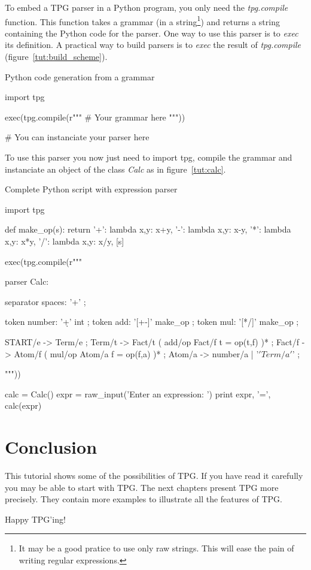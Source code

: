 To embed a TPG parser in a Python program, you only need the \emph{tpg.compile} function.
This function takes a grammar (in a string\footnote{It may be a good pratice to use only raw strings. This will ease the pain of writing regular expressions.}) and returns a string containing the Python code for the parser.
One way to use this parser is to \emph{exec} its definition.
A practical way to build parsers is to \emph{exec} the result of \emph{tpg.compile} (figure~\ref{tut:build_scheme}).

\begin{code}
\caption{Python code generation from a grammar} \label{tut:build_scheme}
\begin{verbatimtab}[4]
import tpg

exec(tpg.compile(r""" # Your grammar here """))

# You can instanciate your parser here
\end{verbatimtab}
\end{code}

To use this parser you now just need to import tpg, compile the grammar and instanciate an object of the class \emph{Calc} as in figure~\ref{tut:calc}.

\begin{code}
\caption{Complete Python script with expression parser} \label{tut:calc}
\begin{verbatimtab}[4]
import tpg

def make_op(s):
	return {
		'+': lambda x,y: x+y,
		'-': lambda x,y: x-y,
		'*': lambda x,y: x*y,
		'/': lambda x,y: x/y,
	}[s]

exec(tpg.compile(r"""

parser Calc:

	separator spaces: '\s+' ;

	token number: '\d+' int ;
	token add: '[+-]' make_op ;
	token mul: '[*/]' make_op ;

	START/e -> Term/e ;
	Term/t -> Fact/t ( add/op Fact/f {{ t = op(t,f) }} )* ;
	Fact/f -> Atom/f ( mul/op Atom/a {{ f = op(f,a) }} )* ;
	Atom/a -> number/a | '\(' Term/a '\)' ;

"""))

calc = Calc()
expr = raw_input('Enter an expression: ')
print expr, '=', calc(expr)
\end{verbatimtab}
\end{code}

\clearpage

\section{Conclusion}

This tutorial shows some of the possibilities of TPG.
If you have read it carefully you may be able to start with TPG.
The next chapters present TPG more precisely.
They contain more examples to illustrate all the features of TPG.

Happy TPG'ing!
